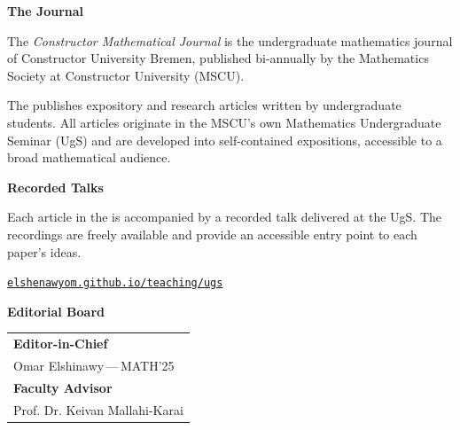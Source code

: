 \begin{minipage}[t]{0.47\textwidth}

  {\large\bfseries\color{cmjcrimson}The Journal}

  \vspace{\internal}

  The \textit{Constructor Mathematical Journal} {} is the
  undergraduate mathematics journal of Constructor University Bremen, published
  bi-annually by the Mathematics Society at Constructor University (MSCU).

  \vspace{0.4cm}

  The {\color{cmjcrimson}{CMJ}} publishes expository and research articles written by undergraduate students. All articles originate in the MSCU's own Mathematics
  Undergraduate Seminar (UgS) and are developed into self-contained expositions,
  accessible to a broad mathematical audience.

  \vspace{\external}
  
  {\large\bfseries\color{cmjcrimson}Recorded Talks}

  \vspace{\internal}

  Each article in the {\color{cmjcrimson}{CMJ}} is accompanied by a recorded talk delivered
  at the UgS. The recordings are freely
  available and provide an accessible entry point to each paper's ideas.

  \vspace{\internal}

  \noindent\href{https://elshenawyom.github.io/teaching/ugs}{\texttt{elshenawyom.github.io/teaching/ugs}}

  \vspace{\external}

      {\large\bfseries\color{cmjcrimson}Editorial Board}

  \vspace{\internal}

  \noindent
  \begin{tabular}{@{}l@{}}
    \textbf{Editor-in-Chief}\\
    Omar Elshinawy\,---\,{\color{cmjgray}MATH'25}\\[0.3cm]
    \textbf{Faculty Advisor}\\
    Prof. Dr. Keivan Mallahi-Karai %
  \end{tabular}


\end{minipage}
